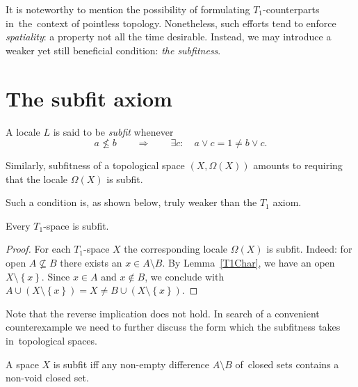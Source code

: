 It is noteworthy to mention the possibility of formulating $T_1$-counterparts
in~the~context of pointless topology.
Nonetheless, such efforts tend to enforce {\sl spatiality\/}: a property not
all the time desirable.
Instead, we may introduce a weaker yet still beneficial condition: {\sl the
subfitness\/}.

\section{The subfit axiom}

\begin{framed}
  \begin{df}[Sfit]
    A locale $L$ is said to be \emph{subfit\/} whenever
    \[
      a \not\le b \qquad \Rightarrow \qquad \exists c: \quad a \vee c = 1 \ne b
      \vee c.
    \]
  \end{df}
\end{framed}

Similarly, subfitness of a topological space $(X, \Omega(X))$ amounts to
requiring that the locale $\Omega(X)$ is subfit.

Such a condition is, as shown below, truly weaker than the $T_1$ axiom.

\begin{prop} \label{T1->Sfit}
  Every $T_1$-space is subfit.
\end{prop}

\begin{proof}
  For each $T_1$-space $X$ the corresponding locale $\Omega(X)$ is subfit.
  Indeed: for open $A\not\subseteq B$ there exists an $x\in A \setminus B$.
  By Lemma~\ref{T1Char}\thinspace, we have an open $X\setminus
  \left\{x\right\}$.
  Since $x\in A$ and $x\not\in B$, we conclude with $A\cup (X\setminus
  \left\{x\right\}) = X \ne B \cup (X\setminus \left\{x\right\})$.
\end{proof}

Note that the reverse implication does not hold.
In search of a convenient counterexample we need to further discuss the form
which the subfitness takes in~topological spaces.

\begin{prop}
  A space $X$ is subfit iff any non-empty difference $A\setminus B$ of~closed
  sets contains a non-void closed set.
\end{prop}

